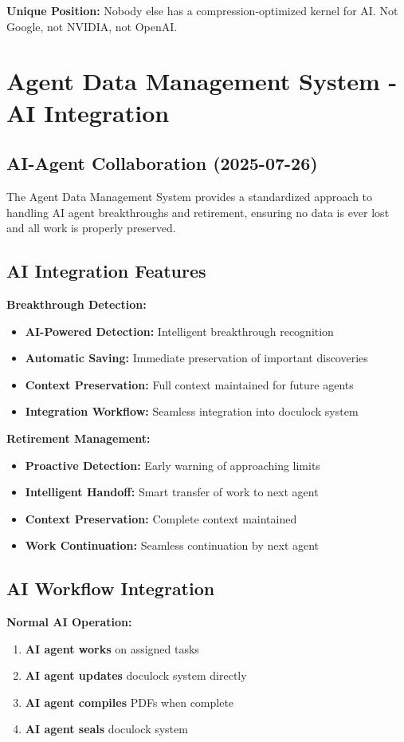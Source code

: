 \documentclass[12pt,a4paper]{article}
\begin{document}
\textbf{Unique Position:} Nobody else has a compression-optimized kernel for AI. Not Google, not NVIDIA, not OpenAI.

\section{Agent Data Management System - AI Integration}

\subsection{AI-Agent Collaboration (2025-07-26)}
The Agent Data Management System provides a standardized approach to handling AI agent breakthroughs and retirement, ensuring no data is ever lost and all work is properly preserved.

\subsection{AI Integration Features}
\textbf{Breakthrough Detection:}
\begin{itemize}
    \item \textbf{AI-Powered Detection:} Intelligent breakthrough recognition
    \item \textbf{Automatic Saving:} Immediate preservation of important discoveries
    \item \textbf{Context Preservation:} Full context maintained for future agents
    \item \textbf{Integration Workflow:} Seamless integration into doculock system
\end{itemize}

\textbf{Retirement Management:}
\begin{itemize}
    \item \textbf{Proactive Detection:} Early warning of approaching limits
    \item \textbf{Intelligent Handoff:} Smart transfer of work to next agent
    \item \textbf{Context Preservation:} Complete context maintained
    \item \textbf{Work Continuation:} Seamless continuation by next agent
\end{itemize}

\subsection{AI Workflow Integration}
\textbf{Normal AI Operation:}
\begin{enumerate}
    \item \textbf{AI agent works} on assigned tasks
    \item \textbf{AI agent updates} doculock system directly
    \item \textbf{AI agent compiles} PDFs when complete
    \item \textbf{AI agent seals} doculock system
\end{enumerate}
\end{document}
